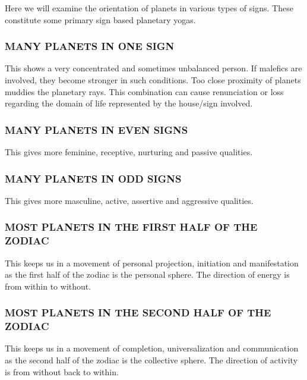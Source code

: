Here we will examine the orientation of planets in various types of signs. These constitute some primary sign based planetary yogas.

 

\subsubsection{MANY PLANETS IN ONE SIGN}

This shows a very concentrated and sometimes unbalanced person. If malefics are involved, they become stronger in such conditions. Too close proximity of planets muddies the planetary rays. This combination can cause renunciation or loss regarding the domain of life represented by the house/sign involved.

 

\subsubsection{MANY PLANETS IN EVEN SIGNS}

This gives more feminine, receptive, nurturing and passive qualities.

 

\subsubsection{MANY PLANETS IN ODD SIGNS}

This gives more masculine, active, assertive and aggressive qualities.

 

\subsubsection{MOST PLANETS IN THE FIRST HALF OF THE ZODIAC}

This keeps us in a movement of personal projection, initiation and manifestation as the first half of the zodiac is the personal sphere. The direction of energy is from within to without.

 

\subsubsection{MOST PLANETS IN THE SECOND HALF OF THE ZODIAC}

This keeps us in a movement of completion, universalization and communication as the second half of the zodiac is the collective sphere. The direction of activity is from without back to within.

